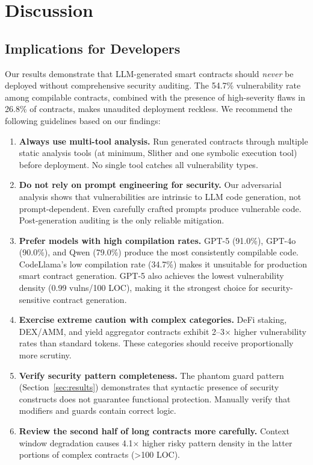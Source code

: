 \section{Discussion}
\label{sec:discussion}

\subsection{Implications for Developers}

Our results demonstrate that LLM-generated smart contracts should \emph{never} be deployed without comprehensive security auditing. The 54.7\% vulnerability rate among compilable contracts, combined with the presence of high-severity flaws in 26.8\% of contracts, makes unaudited deployment reckless. We recommend the following guidelines based on our findings:

\begin{enumerate}[leftmargin=*]
    \item \textbf{Always use multi-tool analysis.} Run generated contracts through multiple static analysis tools (at minimum, Slither and one symbolic execution tool) before deployment. No single tool catches all vulnerability types.
    \item \textbf{Do not rely on prompt engineering for security.} Our adversarial analysis shows that vulnerabilities are intrinsic to LLM code generation, not prompt-dependent. Even carefully crafted prompts produce vulnerable code. Post-generation auditing is the only reliable mitigation.
    \item \textbf{Prefer models with high compilation rates.} GPT-5 (91.0\%), GPT-4o (90.0\%), and Qwen (79.0\%) produce the most consistently compilable code. CodeLlama's low compilation rate (34.7\%) makes it unsuitable for production smart contract generation. GPT-5 also achieves the lowest vulnerability density (0.99 vulns/100 LOC), making it the strongest choice for security-sensitive contract generation.
    \item \textbf{Exercise extreme caution with complex categories.} DeFi staking, DEX/AMM, and yield aggregator contracts exhibit 2--3$\times$ higher vulnerability rates than standard tokens. These categories should receive proportionally more scrutiny.
    \item \textbf{Verify security pattern completeness.} The phantom guard pattern (Section~\ref{sec:results}) demonstrates that syntactic presence of security constructs does not guarantee functional protection. Manually verify that modifiers and guards contain correct logic.
    \item \textbf{Review the second half of long contracts more carefully.} Context window degradation causes 4.1$\times$ higher risky pattern density in the latter portions of complex contracts (>100 LOC).
\end{enumerate}

